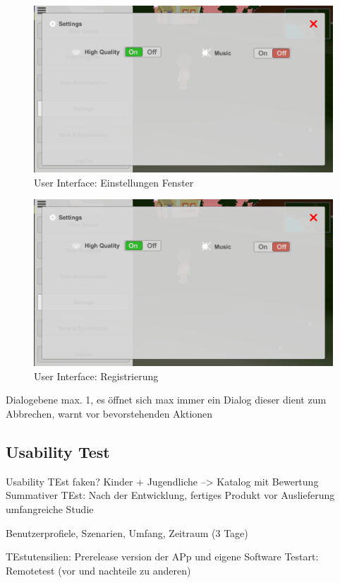 		\begin{figure}[htbp]
			\centering 
			\label{umlControl}
			\includegraphics[width=13cm]{pics/settingsUI.png}
			\caption{User Interface: Einstellungen Fenster}
		\end{figure}

		\begin{figure}[htbp]
			\centering 
			\label{umlControl}
			\includegraphics[width=13cm]{pics/settingsUI.png}
			\caption{User Interface: Registrierung}
		\end{figure}
	
		Dialogebene max. 1, es öffnet sich max immer ein Dialog dieser dient zum Abbrechen, warnt vor bevorstehenden Aktionen
	
	\subsection{Usability Test}
		Usability TEst faken? Kinder + Jugendliche --> Katalog mit Bewertung
		Summativer TEst: Nach der Entwicklung, fertiges Produkt vor Auslieferung umfangreiche Studie
	
		Benutzerprofiele, Szenarien, Umfang, Zeitraum (3 Tage) 
	
		TEstutensilien: Prerelease version der APp und eigene Software
		Testart: Remotetest (vor und nachteile zu anderen)